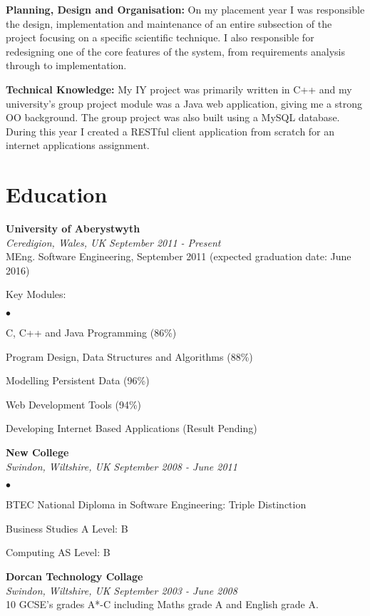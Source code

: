 \documentclass[margin,line]{res}
\newenvironment{list2}{
  \begin{list}{$\bullet$}{%
      \setlength{\itemsep}{0in}
      \setlength{\parsep}{0in} \setlength{\parskip}{0in}
      \setlength{\topsep}{0in} \setlength{\partopsep}{0in}
      \setlength{\leftmargin}{0.2in}}}{\end{list}}
\begin{document}
\begin{resume}
{\bf Planning, Design and Organisation:} On my placement year I was responsible the design, implementation and maintenance of an entire subsection of the project focusing on a specific scientific technique. I also responsible for redesigning one of the core features of the system, from requirements analysis through to implementation.

{\bf Technical Knowledge:} My IY project was primarily written in C++ and my university's group project module was a Java web application, giving me a strong OO background. The group project was also built using a MySQL database. During this year I created a RESTful client application from scratch for an internet applications assignment.

\section{\sc Education}
{\bf University of Aberystwyth}\\
{\it Ceredigion, Wales, UK} \hfill {\it September 2011 - Present}\\
MEng. Software Engineering, September 2011 (expected graduation date: June 2016)

Key Modules:
\begin{list2}

\item C, C++ and Java Programming (86\%)
\item Program Design, Data Structures and Algorithms (88\%)
\item Modelling Persistent Data (96\%)
\item Web Development Tools (94\%)
\item Developing Internet Based Applications (Result Pending)
\end{list2}

{\bf New College}\\
{\it Swindon, Wiltshire, UK} \hfill {\it September 2008 - June 2011}
\begin{list2}
\item BTEC National Diploma in Software Engineering: Triple Distinction
\item Business Studies A Level: B
\item Computing AS Level: B
\end{list2}

{\bf Dorcan Technology Collage} \\
{\it Swindon, Wiltshire, UK} \hfill {\it September 2003 - June 2008}\\
10 GCSE's grades A*-C including Maths grade A and English grade A.


\end{resume}
\end{document}
